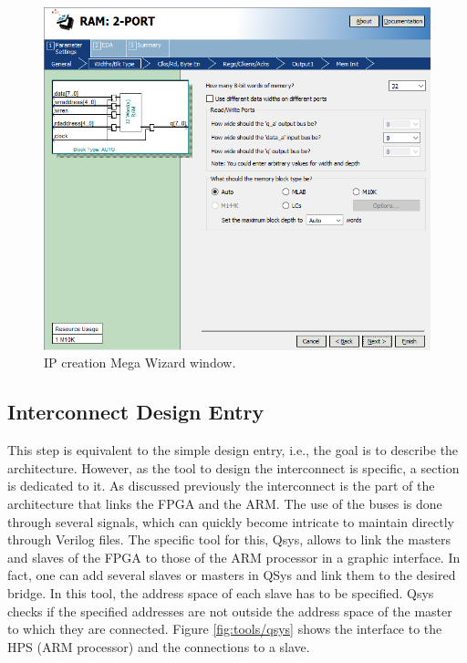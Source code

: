 \begin{figure}[H]
    \centering
    \includegraphics[scale=0.6]{Chapter2-FPGA_Flow/res/megawizard.PNG}
    \caption{IP creation Mega Wizard window.}
    \label{fig:tools/megawizard}
\end{figure}

\subsection{Interconnect Design Entry}

This step is equivalent to the simple design entry, i.e., the goal is to describe the architecture. 
However, as the tool to design the interconnect is specific, a section is dedicated to it. 
As discussed previously the interconnect is the part of the architecture that links the FPGA and the ARM. The 
use of the buses is done through several signals, which can quickly become intricate to 
maintain directly through Verilog files. The specific tool for this, Qsys, allows to link 
the masters and slaves of the FPGA to those of the ARM processor in a graphic interface. In fact,
one can add several slaves or masters in QSys and link them to the desired bridge.  In this 
tool, the address space of each slave has to be specified. Qsys checks if the specified 
addresses are not outside the address space of the master to which they are connected. Figure \ref{fig:tools/qsys} 
shows the interface to the HPS (ARM processor) and the connections to a slave.

